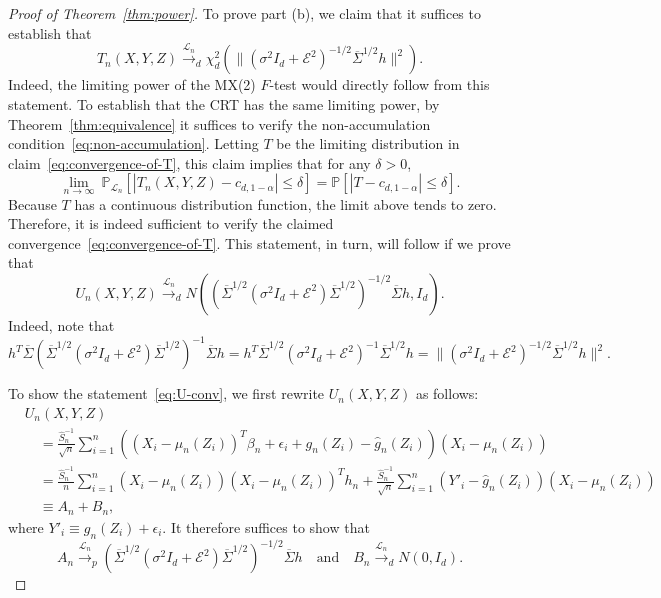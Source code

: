 \documentclass[12pt]{article}
\theoremstyle{definition}
\theoremstyle{remark}
\newcommand{\eps}{\epsilon}
\newcommand{\srx}{X}
\newcommand{\srz}{Z}
\newcommand{\sry}{Y}
\newcommand{\seps}{\epsilon}
\begin{document}
\begin{proof}[Proof of Theorem~\ref{thm:power}]
To prove part (b), we claim that it suffices to establish that
\begin{equation}
	T_n(\srx, \sry, \srz)\overset{\mathcal L_n}\rightarrow_d \chi^2_d(\|(\sigma^2I_d +\mathcal E^2)^{-1/2}\overline \Sigma^{1/2} h\|^2).
	\label{eq:convergence-of-T}
\end{equation}
Indeed, the limiting power of the MX(2) $F$-test would directly follow from this statement. To establish that the CRT has the same limiting power, by Theorem~\ref{thm:equivalence} it suffices to verify the non-accumulation condition~\eqref{eq:non-accumulation}. Letting $T$ be the limiting distribution in claim~\eqref{eq:convergence-of-T}, this claim implies that for any $\delta > 0$,
\begin{equation*}
 \lim_{n \rightarrow \infty}\ \mathbb P_{\mathcal L_n}[|T_n(\srx, \sry, \srz)-c_{d,1-\alpha}| \leq \delta] = \mathbb P[|T - c_{d,1-\alpha}| \leq \delta].
\end{equation*}
Because $T$ has a continuous distribution function, the limit above tends to zero. Therefore, it is indeed sufficient to verify the claimed convergence~\eqref{eq:convergence-of-T}. This statement, in turn, will follow if we prove that
	\begin{equation}
		U_n(\srx, \sry, \srz) \overset{\mathcal L_n}\rightarrow_d N((\overline \Sigma^{1/2}(\sigma^2I_d +\mathcal E^2)\overline \Sigma^{1/2})^{-1/2}\overline \Sigma h, I_d).
		\label{eq:U-conv}
	\end{equation}
	Indeed, note that
	\begin{equation*}
		h^T \overline \Sigma (\overline \Sigma^{1/2}(\sigma^2I_d +\mathcal E^2)\overline \Sigma^{1/2})^{-1}\overline \Sigma h = h^T \overline \Sigma^{1/2} (\sigma^2I_d +\mathcal E^2)^{-1}\overline \Sigma^{1/2} h = \|(\sigma^2I_d +\mathcal E^2)^{-1/2}\overline \Sigma^{1/2} h\|^2.
	\end{equation*}
	
	To show the statement~\eqref{eq:U-conv}, we first rewrite $U_n(\srx, \sry,\srz)$ as follows:
	\begin{equation*}
		\begin{split}
			&U_n(X,Y,Z) \\
			&\quad= \frac{\widehat S^{-1}_n}{\sqrt{n}}\sum_{i = 1}^n ((X_i - \mu_n(Z_i))^T \beta_n + \eps_i + g_n(\srz_i) - \widehat g_n(\srz_i))(\srx_i - \mu_n(\srz_i)) \\
			&\quad= \frac{\widehat S^{-1}_n}{n}\sum_{i = 1}^n (\srx_i - \mu_n(\srz_i))(X_i - \mu_n(Z_i))^T h_n + \frac{\widehat S^{-1}_n}{\sqrt{n}}\sum_{i = 1}^n (Y'_i - \widehat g_n(Z_i))(\srx_i - \mu_n(\srz_i)) \\
			&\quad \equiv A_n + B_n,
		\end{split}
	\end{equation*}
	where $Y'_i \equiv g_n(\srz_i) + \seps_i.$ It therefore suffices to show that
	\begin{equation}
		A_n \overset{\mathcal L_n}\rightarrow_p (\overline \Sigma^{1/2}(\sigma^2 I_d + \mathcal E^2)\overline \Sigma^{1/2})^{-1/2}\overline \Sigma h\quad \text{and} \quad B_n \overset{\mathcal L_n}\rightarrow_d N(0, I_d).
		\label{eq:sufficient}
	\end{equation}
	

\end{proof}
\end{document}
